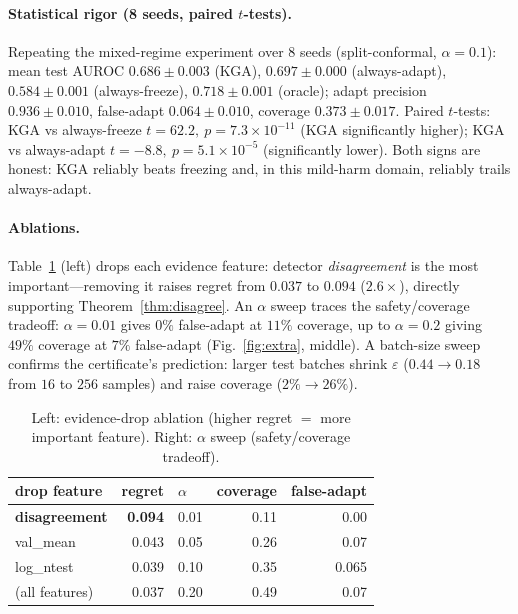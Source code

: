\documentclass[conference]{IEEEtran}
\theoremstyle{plain}
\theoremstyle{definition}
\begin{document}
\paragraph{Statistical rigor (8 seeds, paired $t$-tests).} Repeating the mixed-regime
experiment over 8 seeds (split-conformal, $\alpha{=}0.1$): mean test AUROC
$0.686\pm0.003$ (\textsc{KGA}), $0.697\pm0.000$ (always-adapt), $0.584\pm0.001$
(always-freeze), $0.718\pm0.001$ (oracle); adapt precision $0.936\pm0.010$, false-adapt
$0.064\pm0.010$, coverage $0.373\pm0.017$. Paired $t$-tests: \textsc{KGA} vs
always-freeze $t{=}62.2,\ p{=}7.3\times10^{-11}$ (\textsc{KGA} significantly higher);
\textsc{KGA} vs always-adapt $t{=}-8.8,\ p{=}5.1\times10^{-5}$ (significantly lower).
Both signs are honest: \textsc{KGA} reliably beats freezing and, in this mild-harm
domain, reliably trails always-adapt.

\paragraph{Ablations.} Table~\ref{tab:abl} (left) drops each evidence feature: detector
\emph{disagreement} is the most important---removing it raises regret from $0.037$ to
$0.094$ ($2.6\times$), directly supporting Theorem~\ref{thm:disagree}. An $\alpha$ sweep
traces the safety/coverage tradeoff: $\alpha{=}0.01$ gives $0\%$ false-adapt at $11\%$
coverage, up to $\alpha{=}0.2$ giving $49\%$ coverage at $7\%$ false-adapt
(Fig.~\ref{fig:extra}, middle). A batch-size sweep confirms the certificate's
prediction: larger test batches shrink $\varepsilon$ ($0.44\!\to\!0.18$ from $16$ to
$256$ samples) and raise coverage ($2\%\!\to\!26\%$).

\begin{table}[t]\centering\small
\begin{tabular}{lr@{\hskip 2em}lrr}
\toprule
drop feature & regret & $\alpha$ & coverage & false-adapt\\
\midrule
\textbf{disagreement} & \textbf{0.094} & 0.01 & 0.11 & 0.00\\
val\_mean & 0.043 & 0.05 & 0.26 & 0.07\\
log\_ntest & 0.039 & 0.10 & 0.35 & 0.065\\
(all features) & 0.037 & 0.20 & 0.49 & 0.07\\
\bottomrule
\end{tabular}
\caption{Left: evidence-drop ablation (higher regret $=$ more important feature).
Right: $\alpha$ sweep (safety/coverage tradeoff).}
\label{tab:abl}
\end{table}
\end{document}
